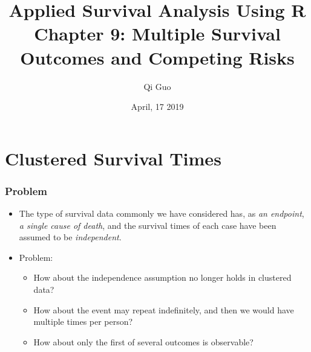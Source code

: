 \documentclass{beamer}
\title[Survival Analysis]{Applied Survival Analysis Using R\\ Chapter 9: Multiple Survival Outcomes and Competing Risks}
\author[Qi Guo]{Qi Guo}
\institute[UTD]{Department of Mathematical Sciences \\ 
	The University of Texas at Dallas}
\date{April, 17 2019}
\newcommand{\empr}[1]{{\emph{\color{red}#1}}}
\begin{document}
\begin{frame}
  \titlepage
\end{frame}

\bgroup
{}


\section[Outline]{}
\begin{frame}
  \tableofcontents
\end{frame}

\section{Clustered Survival Times}
\begin{frame}
\frametitle{Problem}
\begin{itemize}
\item The type of survival data commonly we have considered has, as \empr{an endpoint}, \empr{a single cause of death}, and the survival times of each case have been assumed to be \empr{independent}.
\item  Problem:
\begin{itemize}
\item How about the independence assumption no longer holds in clustered data?
\item How about the event may repeat indefinitely, and then we would have multiple times per person?
\item How about only the first of several outcomes is observable?
\end{itemize}
\end{itemize}
\end{frame}
\end{document}
